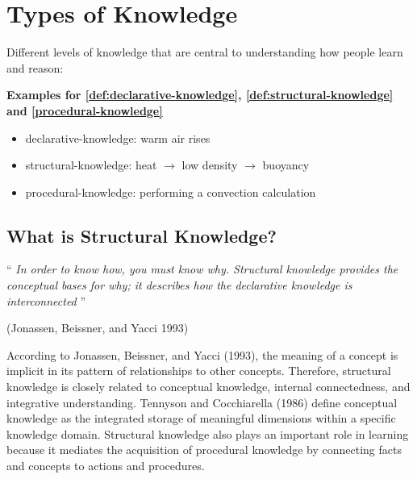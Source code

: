 

\section{Types of Knowledge}
Different levels of knowledge that are central to understanding how people learn and
reason:


\begin{bsp}
    \textbf{Examples for \autoref{def:declarative-knowledge}, \autoref{def:structural-knowledge} and
    \autoref{procedural-knowledge}} \\
    \begin{itemize}
        \item \Gls{declarative-knowledge}: warm air rises
        \item \Gls{structural-knowledge}: heat $\rightarrow$ low density $\rightarrow$ buoyancy
        \item \Gls{procedural-knowledge}: performing a convection calculation
    \end{itemize}
\end{bsp}

\subsection*{What is Structural Knowledge?}

\begin{center}
    `` \textit{In order to know how, you must know why. Structural knowledge provides the
    conceptual bases for why; it describes how the declarative knowledge is
    interconnected} ''
\end{center}
(Jonassen, Beissner, and Yacci 1993)

According to Jonassen, Beissner, and Yacci (1993), the meaning of a concept is implicit in its pattern of relationships to other concepts.
Therefore, structural knowledge is closely related to conceptual knowledge, internal connectedness, and integrative understanding.
Tennyson and Cocchiarella (1986) define conceptual knowledge as the integrated storage of meaningful dimensions within a specific knowledge domain.
Structural knowledge also plays an important role in learning because it mediates the acquisition of procedural
knowledge by connecting facts and concepts to actions and procedures.

